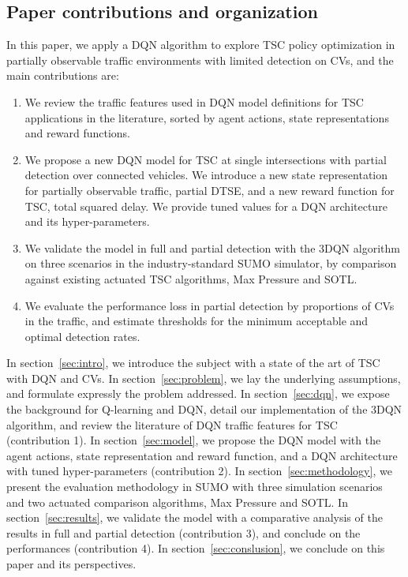 \documentclass[journal]{IEEEtran}
\begin{document}
\subsection{Paper contributions and organization}
In this paper, we apply a DQN algorithm to explore TSC policy optimization in partially observable traffic environments with limited detection on CVs, and the main contributions are:
\begin{enumerate}
  \item We review the traffic features used in DQN model definitions for TSC applications in the literature, sorted by agent actions, state representations and reward functions.
  \item We propose a new DQN model for TSC at single intersections with partial detection over connected vehicles. We introduce a new state representation for partially observable traffic, partial DTSE, and a new reward function for TSC, total squared delay. We provide tuned values for a DQN architecture and its hyper-parameters.
  \item We validate the model in full and partial detection with the 3DQN algorithm on three scenarios in the industry-standard SUMO simulator, by comparison against existing actuated TSC algorithms, Max Pressure and SOTL.
  \item We evaluate the performance loss in partial detection by proportions of CVs in the traffic, and estimate thresholds for the minimum acceptable and optimal detection rates.
\end{enumerate}

In section~\ref{sec:intro}, we introduce the subject with a state of the art of TSC with DQN and CVs. In section~\ref{sec:problem}, we lay the underlying assumptions, and formulate expressly the problem addressed. In section~\ref{sec:dqn}, we expose the background for Q-learning and DQN, detail our implementation of the 3DQN algorithm, and review the literature of DQN traffic features for TSC (contribution 1). In section~\ref{sec:model}, we propose the DQN model with the agent actions, state representation and reward function, and a DQN architecture with tuned hyper-parameters (contribution 2). In section~\ref{sec:methodology}, we present the evaluation methodology in SUMO with three simulation scenarios and two actuated comparison algorithms, Max Pressure and SOTL. In section~\ref{sec:results}, we validate the model with a comparative analysis of the results in full and partial detection (contribution 3), and conclude on the performances (contribution 4). In section~\ref{sec:conslusion}, we conclude on this paper and its perspectives.
\end{document}
